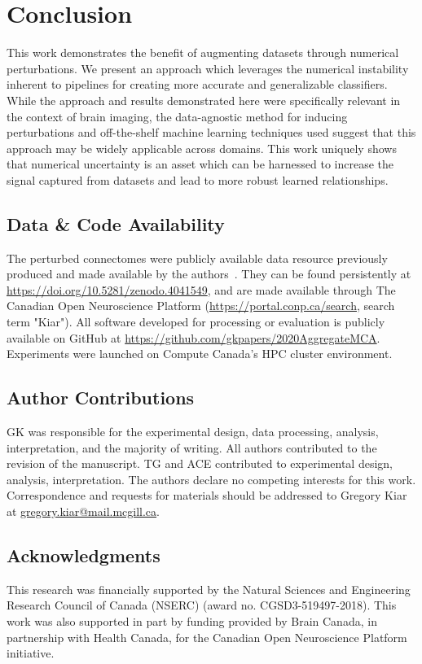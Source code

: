 \documentclass[10pt]{SelfArx} %
\begin{document}
\section*{Conclusion}

This work demonstrates the benefit of augmenting datasets through numerical perturbations. We present an approach which
leverages the numerical instability inherent to pipelines for creating more accurate and generalizable classifiers.
While the approach and results demonstrated here were specifically relevant in the context of brain imaging, the
data-agnostic method for inducing perturbations and off-the-shelf machine learning techniques used suggest that this
approach may be widely applicable across domains. This work uniquely shows that numerical uncertainty is an asset which
can be harnessed to increase the signal captured from datasets and lead to more robust learned relationships.


\subsection*{Data \& Code Availability}
The perturbed connectomes were publicly available data resource previously produced and made available by the
authors~\cite{Kiar2020-yz}. They can be found persistently at \url{https://doi.org/10.5281/zenodo.4041549}, and are
made available through The Canadian Open Neuroscience Platform (\url{https://portal.conp.ca/search}, search term
"Kiar"). All software developed for processing or evaluation is publicly available on GitHub at
\url{https://github.com/gkpapers/2020AggregateMCA}. Experiments were launched on Compute Canada's HPC cluster
environment. 

\subsection*{Author Contributions}
GK was responsible for the experimental design, data processing, analysis, interpretation, and the majority of writing.
All authors contributed to the revision of the manuscript. TG and ACE contributed to experimental design, analysis,
interpretation. The authors declare no competing interests for this work. Correspondence and requests for materials
should be addressed to Gregory Kiar at \url{gregory.kiar@mail.mcgill.ca}.

\subsection*{Acknowledgments} 
This research was financially supported by the Natural Sciences and Engineering Research Council of Canada (NSERC)
(award no. CGSD3-519497-2018). This work was also supported in part by funding provided by Brain Canada, in partnership
with Health Canada, for the Canadian Open Neuroscience Platform initiative.



\end{document}
